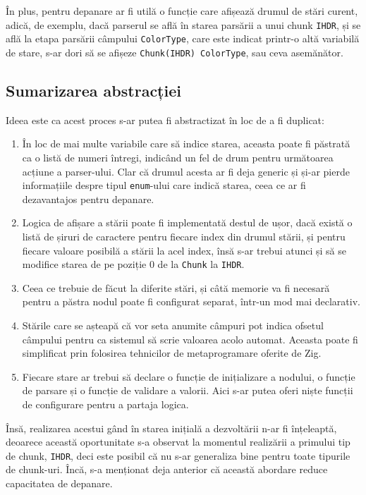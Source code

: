 \documentclass[a4paper,12pt]{report}
\begin{document}
În plus, pentru depanare ar fi utilă o funcție care afișează drumul de stări curent,
adică, de exemplu, dacă parserul se află în starea parsării a unui chunk \texttt{IHDR}, 
și se află la etapa parsării câmpului \texttt{ColorType},
care este indicat printr-o altă variabilă de stare,
s-ar dori să se afișeze \texttt{Chunk(IHDR) ColorType}, sau ceva asemănător.

\subsection{Sumarizarea abstracției}

Ideea este ca acest proces s-ar putea fi abstractizat în loc de a fi duplicat:
\begin{enumerate}
\item
    În loc de mai multe variabile care să indice starea, aceasta poate fi păstrată ca
    o listă de numeri întregi, indicând un fel de drum pentru următoarea acțiune a parser-ului.
    Clar că drumul acesta ar fi deja generic și și-ar pierde informațiile despre tipul
    \texttt{enum}-ului care indică starea, ceea ce ar fi dezavantajos pentru depanare.
\item
    Logica de afișare a stării poate fi implementată destul de ușor, dacă există o listă de
    șiruri de caractere pentru fiecare index din drumul stării,
    și pentru fiecare valoare posibilă a stării la acel index,
    însă s-ar trebui atunci și să se modifice starea
    de pe poziție 0 de la \texttt{Chunk} la \texttt{IHDR}.
\item
    Ceea ce trebuie de făcut la diferite stări,
    și câtă memorie va fi necesară pentru a păstra nodul poate fi configurat separat,
    într-un mod mai declarativ.
\item
    Stările care se așteapă că vor seta anumite câmpuri
    pot indica ofsetul câmpului pentru ca sistemul să scrie valoarea acolo automat.
    Aceasta poate fi simplificat prin folosirea tehnicilor de metaprogramare oferite de Zig.
\item
    Fiecare stare ar trebui să declare o funcție de inițializare a nodului,
    o funcție de parsare și o funcție de validare a valorii.
    Aici s-ar putea oferi niște funcții de configurare pentru a partaja logica.
\end{enumerate}

Însă, realizarea acestui gând în starea inițială a dezvoltării n-ar fi înțeleaptă,
deoarece această oportunitate s-a observat la momentul
realizării a primului tip de chunk, \texttt{IHDR},
deci este posibil că nu s-ar generaliza bine pentru toate tipurile de chunk-uri.
Încă, s-a menționat deja anterior că această abordare reduce capacitatea de depanare.
\end{document}
